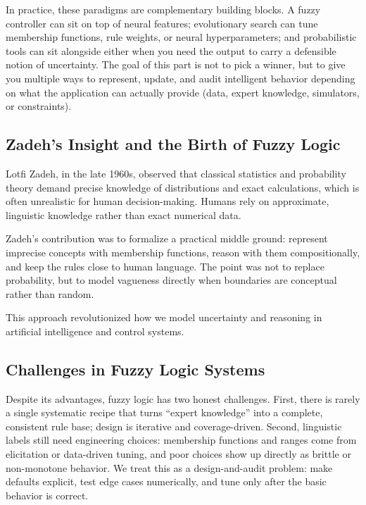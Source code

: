 In practice, these paradigms are complementary building blocks. A fuzzy controller can sit on top of neural features; evolutionary search can tune membership functions, rule weights, or neural hyperparameters; and probabilistic tools can sit alongside either when you need the output to carry a defensible notion of uncertainty. The goal of this part is not to pick a winner, but to give you multiple ways to represent, update, and audit intelligent behavior depending on what the application can actually provide (data, expert knowledge, simulators, or constraints).

\subsection{Zadeh's Insight and the Birth of Fuzzy Logic}
\label{sec:softcomp_zadeh_s_insight_and_the_birth_of_fuzzy_logic}

Lotfi Zadeh, in the late 1960s, observed that classical statistics and probability theory demand precise knowledge of distributions and exact calculations, which is often unrealistic for human decision-making. Humans rely on approximate, linguistic knowledge rather than exact numerical data.

Zadeh's contribution was to formalize a practical middle ground: represent imprecise concepts with membership functions, reason with them compositionally, and keep the rules close to human language. The point was not to replace probability, but to model vagueness directly when boundaries are conceptual rather than random.

This approach revolutionized how we model uncertainty and reasoning in artificial intelligence and control systems.

\subsection{Challenges in Fuzzy Logic Systems}
\label{sec:softcomp_challenges_in_fuzzy_logic_systems}

Despite its advantages, fuzzy logic has two honest challenges. First, there is rarely a single systematic recipe that turns ``expert knowledge'' into a complete, consistent rule base; design is iterative and coverage-driven. Second, linguistic labels still need engineering choices: membership functions and ranges come from elicitation or data-driven tuning, and poor choices show up directly as brittle or non-monotone behavior. We treat this as a design-and-audit problem: make defaults explicit, test edge cases numerically, and tune only after the basic behavior is correct.

